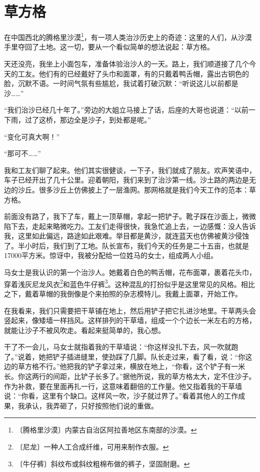 \documentclass[12pt,UTF-8,openany]{ctexbook}
\begin{document}
\chapter{草方格}

\begin{large}
    
    在中国西北的腾格里沙漠\footnote{〔腾格里沙漠〕内蒙古自治区阿拉善地区东南部的沙漠。}，有一项人类治沙历史上的奇迹：这里的人们，从沙漠手里夺回了土地。这一切，要从一个看似简单的想法说起：草方格。
    
    天还没亮，我坐上小面包车，准备体验治沙人的一天。路上，我们顺道接了几个今天的工友。他们有的已经戴好了头巾和面罩，有的只戴着鸭舌帽，露出古铜色的脸，沉默不语。一时间气氛有些尴尬，我试着打破沉默：“听说这儿以前都是沙……”
    
    “我们治沙已经几十年了。”旁边的大姐立马接上了话，后座的大哥也说道：“以前一下雨，过了这桥，那边全是沙子，到处都是呢。”
    
    “变化可真大啊！”
    
    “那可不……”
    
    我和工友们聊了起来。他们其实很健谈，一下子，我们就成了朋友。欢声笑语中，车子已经开出了几十公里。迎着朝阳，我们来到了治沙第一线。沙土路的两边是无边的沙丘。很多沙丘上仿佛披上了一层渔网。那网格就是我们今天工作的范本：草方格。
    
    前面没有路了，我下了车，戴上一顶草帽，拿起一把铲子。靴子踩在沙面上，微微陷下去，走起来略微吃力。工友们走得很快，我急忙追上去，一边感慨：没人告诉我，这里如此偏远，路途如此艰难。举目都是黄沙，就连蓝天也仿佛被黄沙侵蚀了。半小时后，我们到了工地。队长宣布，我们今天的任务是二十五亩，也就是17000平方米。惊讶中，我被分配给一位姓马的女士，组成两人小组。
    
    马女士是我认识的第一个治沙人。她戴着白色的鸭舌帽，花布面罩，裹着花头巾，穿着浅灰尼龙风衣\footnote{〔尼龙〕一种人工合成纤维，可用来制作衣服。}和蓝色牛仔裤\footnote{〔牛仔裤〕斜纹布或斜纹粗棉布做的裤子，坚固耐磨。}。这种混乱的打扮似乎是这里常见的风格。相比之下，戴着草帽的我倒像是个来拍照的杂志模特儿。我戴上面罩，开始工作。
    
    在我看来，我们只需要把干草铺在地上，然后用铲子把它扎进沙地里。干草两头会竖起来，像矮墙一样挡风。这样排列的干草墙，组成一个个边长一米左右的方格，就能让沙子不被风吹走。看起来挺简单的，我心想。
    
    干了不一会儿，马女士就指着我的干草墙说：“你这样没扎下去，风一吹就跑了。”说着，她把铲子插进缝里，使劲踩了几脚。队长走过来，看了看，说：“你这边的草方格不行。”他把我的铲子拿过来，横放在地上，“你看，这个铲子有一米长。你这两行的间距，比铲子长多了。”据他所说，我的草方格太大，定不住沙子。作为补救，要在里面再扎一行，这意味着翻倍的工作量。他又指着我的干草墙说：“你看，这里有个缺口。这样风一吹，沙子就过界了。”看着其他人的工作成果，我承认，我弄砸了，只好按照他们说的重做。
    

\end{large}
\end{document}
